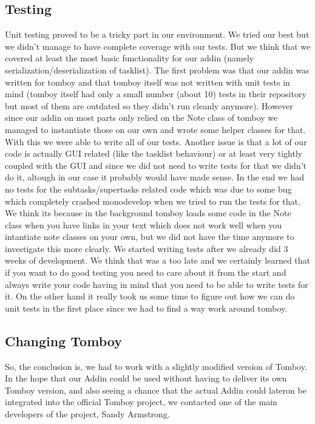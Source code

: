\subsection{Testing}
\label{testing}
Unit testing proved to be a tricky part in our environment. We tried our best but we didn't manage to have complete coverage with our tests. But we think that we covered at least the most basic functionality for our addin (namely serialization/deserialization of tasklist).
The first problem was that our addin was written for tomboy and that tomboy itself was not written with unit tests in mind (tomboy itself had only a small number (about 10) tests in their repository but most of them are outdated so they didn't run cleanly anymore). However since our addin on most parts only relied on the Note class of tomboy we managed to instantiate those on our own and wrote some helper classes for that. With this we were able to write all of our tests.
Another issue is that a lot of our code is actually GUI related (like the tasklist behaviour) or at least very tightly coupled with the GUI and since we did not need to write tests for that we didn't do it, altough in our case it probably would have made sense.
In the end we had no tests for the subtasks/supertasks related code which was due to some bug which completely crashed monodevelop when we tried to run the tests for that. We think its because in the background tomboy loads some code in the Note class when you have links in your text which does not work well when you intantiate note classes on your own, but we did not have the time anymore to investigate this more clearly.
We started writing tests after we already did 3 weeks of development. We think that was a too late and we certainly learned that if you want to do good testing you need to care about it from the start and always write your code having in mind that you need to be able to write tests for it. On the other hand it really took us some time to figure out how we can do unit tests in the first place since we had to find a way work around tomboy.


\subsection{Changing Tomboy}
\label{changing_tomboy}
So, the conclusion is, we had to work with a slightly modified version of Tomboy. In the hope that our Addin could be used without having to deliver its own Tomboy version, and also seeing a chance that the actual Addin could lateron be integrated into the official Tomboy project, we contacted one of the main developers of the project, Sandy Armstrong.

